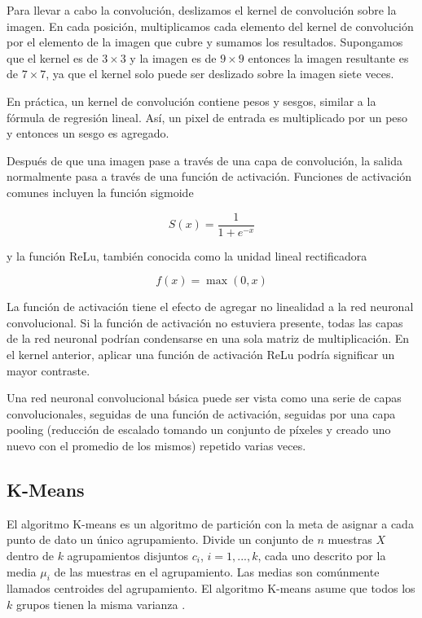 Para llevar a cabo la convolución, deslizamos el kernel de convolución sobre la imagen. En cada posición, multiplicamos cada elemento del kernel de convolución por el elemento de la imagen que cubre y sumamos los resultados. Supongamos que el kernel es de $3\times3$ y la imagen es de $9\times 9$ entonces la imagen resultante es de $7\times 7$, ya que el kernel solo puede ser deslizado sobre la imagen siete veces.

En práctica, un kernel de convolución contiene pesos y sesgos, similar a la fórmula de regresión lineal. Así, un pixel de entrada es multiplicado por un peso y entonces un sesgo es agregado.

Después de que una imagen pase a través de una capa de convolución, la salida normalmente pasa a través de una función de activación. Funciones de activación comunes incluyen la función sigmoide

\[
S(x)=\frac{1}{1+e^{-x}}
\]

y la función ReLu, también conocida como la unidad lineal rectificadora

\[
f(x)=\max (0, x)
\]
 
La función de activación tiene el efecto de agregar no linealidad a la red neuronal convolucional. Si la función de activación no estuviera presente, todas las capas de la red neuronal podrían condensarse en una sola matriz de multiplicación. En el kernel anterior, aplicar una función de activación ReLu podría significar un mayor contraste.

Una red neuronal convolucional básica puede ser vista como una serie de capas convolucionales, seguidas de una función de activación, seguidas por una capa pooling (reducción de escalado tomando un conjunto de píxeles y creado uno nuevo con el promedio de los mismos) repetido varias veces.
 

\subsection{K-Means}

El algoritmo K-means es un algoritmo de partición con la meta de asignar a cada punto de dato un único agrupamiento. Divide un conjunto de $n$ muestras $X$ dentro de $k$ agrupamientos disjuntos $c_i$, $i=1,...,k$, cada uno descrito por la media $\mu_i$ de las muestras en el agrupamiento. Las medias son comúnmente llamados centroides del agrupamiento. El algoritmo K-means asume que todos los $k$ grupos tienen la misma varianza \parencite{igualIntroductionDataScience2017}.


